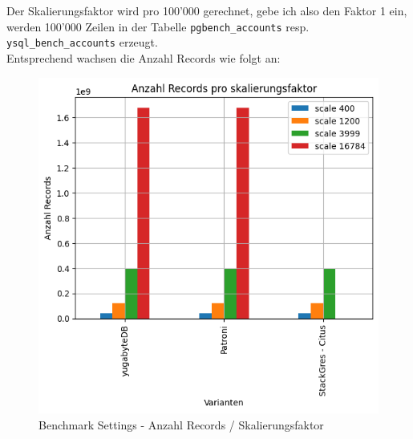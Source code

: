 \begin{flushleft}
    Der Skalierungsfaktor wird pro 100'000 gerechnet, gebe ich also den Faktor 1 ein, werden 100'000 Zeilen in der Tabelle \texttt{pgbench\_accounts} resp. \texttt{ysql\_bench\_accounts} erzeugt.\\
    Entsprechend wachsen die Anzahl Records wie folgt an:\\
    \begin{figure}[H]
        \centering
        \includegraphics[width=0.5\linewidth]{source/pandas_data_chart_plotter/row_counts}
        \caption{Benchmark Settings - Anzahl Records / Skalierungsfaktor}
        \label{fig:row_counts}
    \end{figure}
\end{flushleft}